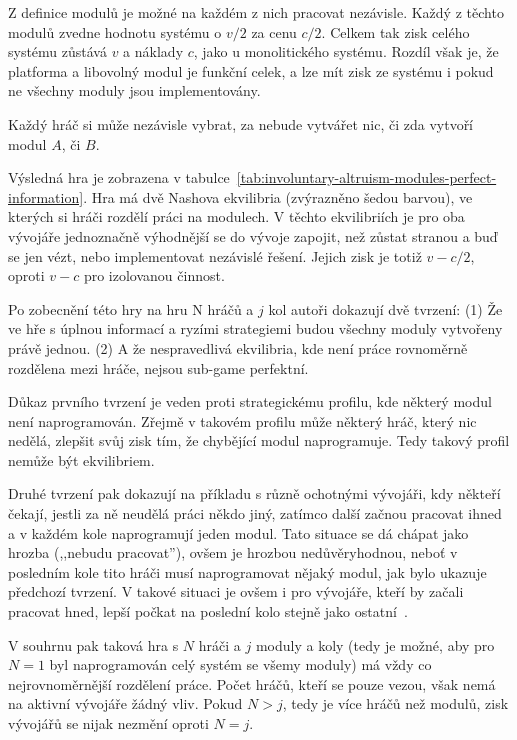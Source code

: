 \begin{multicols}{2}
		Z definice modulů je možné na každém z nich pracovat nezávisle. Každý z těchto modulů zvedne hodnotu systému o $v/2$ za cenu $c/2$. Celkem tak zisk celého systému zůstává $v$ a náklady $c$, jako u monolitického systému. Rozdíl však je, že platforma a libovolný modul je funkční celek, a lze mít zisk ze systému i pokud ne všechny moduly jsou implementovány.

		Každý hráč si může nezávisle vybrat, za nebude vytvářet nic, či zda vytvoří modul $A$, či $B$.

		Výsledná hra je zobrazena v tabulce~\ref{tab:involuntary-altruism-modules-perfect-information}. Hra má dvě Nashova ekvilibria (zvýrazněno šedou barvou), ve kterých si hráči rozdělí práci na modulech. V těchto ekvilibriích je pro oba vývojáře jednoznačně výhodnější se do vývoje zapojit, než zůstat stranou a buď se jen vézt, nebo implementovat nezávislé řešení. Jejich zisk je totiž $v - c/2$, oproti $v-c$ pro izolovanou činnost.

		Po zobecnění této hry na hru N hráčů a $j$ kol autoři dokazují dvě tvrzení: (1) Že ve hře s úplnou informací a ryzími strategiemi budou všechny moduly vytvořeny právě jednou. (2) A že nespravedlivá ekvilibria, kde není práce rovnoměrně rozdělena mezi hráče, nejsou sub-game perfektní.

		Důkaz prvního tvrzení je veden proti strategickému profilu, kde některý modul není naprogramován. Zřejmě v takovém profilu může některý hráč, který nic nedělá, zlepšit svůj zisk tím, že chybějící modul naprogramuje. Tedy takový profil nemůže být ekvilibriem.

		Druhé tvrzení pak dokazují na příkladu s různě ochotnými vývojáři, kdy někteří čekají, jestli za ně neudělá práci někdo jiný, zatímco další začnou pracovat ihned a v každém kole naprogramují jeden modul. Tato situace se dá chápat jako hrozba (,,nebudu pracovat''), ovšem je hrozbou nedůvěryhodnou, neboť v posledním kole tito hráči musí naprogramovat nějaký modul, jak bylo ukazuje předchozí tvrzení. V takové situaci je ovšem i pro vývojáře, kteří by začali pracovat hned, lepší počkat na poslední kolo stejně jako ostatní~\cite[kap. 4.1]{architecture-opensource}.

		V souhrnu pak taková hra s $N$ hráči a $j$ moduly a koly (tedy je možné, aby pro $N =1$ byl naprogramován celý systém se všemy moduly) má vždy co nejrovnoměrnější rozdělení práce. Počet hráčů, kteří se pouze vezou, však nemá na aktivní vývojáře žádný vliv. Pokud $N > j$, tedy je více hráčů než modulů, zisk vývojářů se nijak nezmění oproti $N = j$.


\end{multicols}
